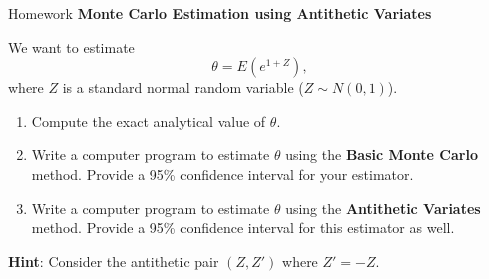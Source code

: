 \documentclass[8pt]{beamer}
\begin{document}
\begin{frame}{Homework }
\textbf{Monte Carlo Estimation using Antithetic Variates}

We want to estimate 
\begin{equation*}
\theta = E(e^{1 + Z}),
\end{equation*}
where $Z$ is a standard normal random variable ($Z \sim N(0,1)$).

\begin{enumerate}
  \item Compute the exact analytical value of $\theta$.
  \item Write a computer program to estimate $\theta$ using the \textbf{Basic Monte Carlo} method.
        Provide a 95\% confidence interval for your estimator.
  \item Write a computer program to estimate $\theta$ using the \textbf{Antithetic Variates} method.
        Provide a 95\% confidence interval for this estimator as well.
\end{enumerate}

\textbf{Hint}: Consider the antithetic pair $(Z, Z')$ where $Z' = -Z$.
\end{frame}
\end{document}
